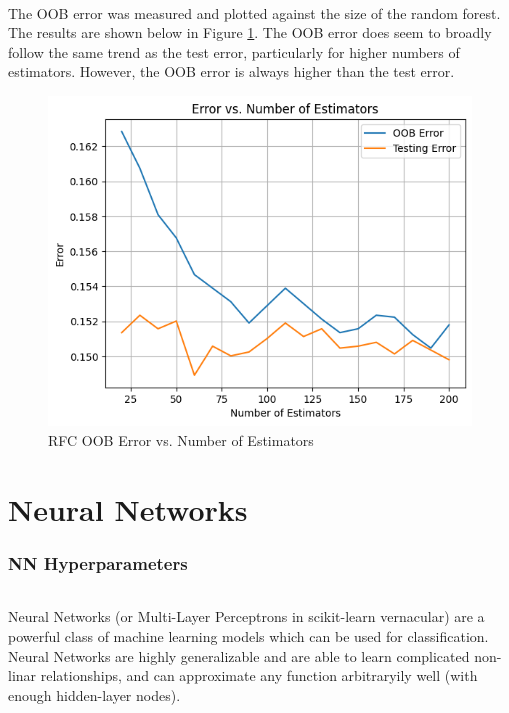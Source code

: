 \documentclass[12pt, letterpaper]{article}
\begin{document}
\paragraph*{}The OOB error was measured and plotted against the size of the random
forest. The results are shown below in Figure \ref{fig:rf8}. The OOB error does seem
to broadly follow the same trend as the test error, particularly for higher numbers
of estimators. However, the OOB error is always higher than the test error.


\begin{figure}[ht]
    \centering
    \includegraphics[width=\textwidth]{rf/rf14.png} %
    \caption{RFC OOB Error vs. Number of Estimators}
    \label{fig:rf8}
\end{figure}


\pagebreak
\part*{Neural Networks}

\section{NN Hyperparameters}

\paragraph*{}Neural Networks (or Multi-Layer Perceptrons in scikit-learn vernacular)
are a powerful class of machine learning models which can be used for classification.
Neural Networks are highly generalizable and are able to learn complicated non-linar
relationships, and can approximate any function arbitraryily well (with enough hidden-layer nodes).
\end{document}

